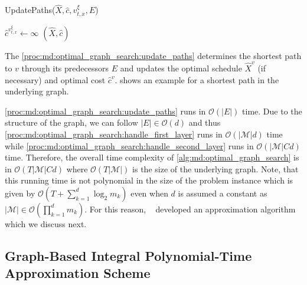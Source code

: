\begin{function}
	\caption{UpdatePaths($\hat{X}, \hat{c}, v_{t,x}^{\xi}, E$)}\label{proc:md:optimal_graph_search:update_paths}
	$\hat{c}^{v_{t,x}^{\xi}} \gets \infty$\;
    \Return $(\hat{X}, \hat{c})$\;
\end{function}

The \cref{proc:md:optimal_graph_search:update_paths} determines the shortest path to $v$ through its predecessors $E$ and updates the optimal schedule $\hat{X}^v$ (if necessary) and optimal cost $\hat{c}^v$.  shows an example for a shortest path in the underlying graph.

\ref{proc:md:optimal_graph_search:update_paths} runs in $\mathcal{O}(|E|)$ time. Due to the structure of the graph, we can follow $|E| \in \mathcal{O}(d)$ and thus \ref{proc:md:optimal_graph_search:handle_first_layer} runs in $\mathcal{O}(|\mathcal{M}| d)$ time while \ref{proc:md:optimal_graph_search:handle_second_layer} runs in $\mathcal{O}(|\mathcal{M}| C d)$ time. Therefore, the overall time complexity of \cref{alg:md:optimal_graph_search} is in $\mathcal{O}(T |\mathcal{M}| C d)$ where $\mathcal{O}(T |\mathcal{M}|)$ is the size of the underlying graph. Note, that this running time is not polynomial in the size of the problem instance which is given by $\mathcal{O}(T + \sum_{k=1}^d \log_2 m_k)$ even when $d$ is assumed a constant as $|\mathcal{M}| \in \mathcal{O}(\prod_{k=1}^d m_k)$. For this reason, \citeauthor*{Albers2021_2}~\cite{Albers2021_2} developed an approximation algorithm which we discuss next.

\subsection{Graph-Based Integral Polynomial-Time Approximation Scheme}

